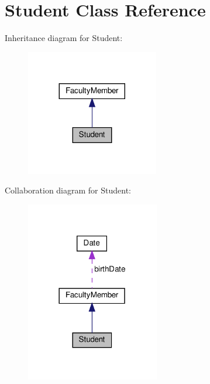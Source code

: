 \hypertarget{classStudent}{}\section{Student Class Reference}
\label{classStudent}


Inheritance diagram for Student\+:\nopagebreak
\begin{figure}[H]
\begin{center}
\leavevmode
\includegraphics[width=164pt]{classStudent__inherit__graph}
\end{center}
\end{figure}


Collaboration diagram for Student\+:\nopagebreak
\begin{figure}[H]
\begin{center}
\leavevmode
\includegraphics[width=165pt]{classStudent__coll__graph}
\end{center}
\end{figure}
